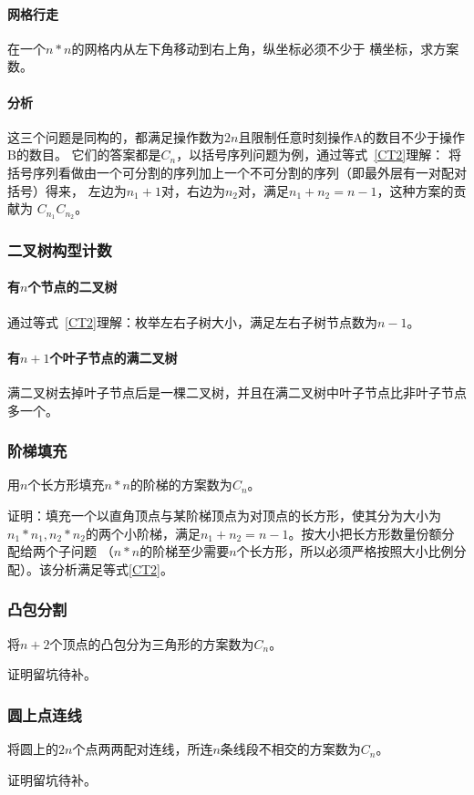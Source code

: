 \paragraph{网格行走} 在一个$n*n$的网格内从左下角移动到右上角，纵坐标必须不少于
横坐标，求方案数。
\paragraph{分析}
这三个问题是同构的，都满足操作数为$2n$且限制任意时刻操作A的数目不少于操作B的数目。
它们的答案都是$C_n$，以括号序列问题为例，通过等式~\ref{CT2}理解：
将括号序列看做由一个可分割的序列加上一个不可分割的序列（即最外层有一对配对括号）得来，
左边为$n_1+1$对，右边为$n_2$对，满足$n_1+n_2=n-1$，这种方案的贡献为
$C_{n_1}C_{n_2}$。
\subsubsection{二叉树构型计数}
\paragraph{有$n$个节点的二叉树}
通过等式~\ref{CT2}理解：枚举左右子树大小，满足左右子树节点数为$n-1$。
\paragraph{有$n+1$个叶子节点的满二叉树}
满二叉树去掉叶子节点后是一棵二叉树，并且在满二叉树中叶子节点比非叶子节点多一个。
\subsubsection{阶梯填充}
用$n$个长方形填充$n*n$的阶梯的方案数为$C_n$。

证明：填充一个以直角顶点与某阶梯顶点为对顶点的长方形，使其分为大小为
$n_1*n_1,n_2*n_2$的两个小阶梯，满足$n_1+n_2=n-1$。按大小把长方形数量份额分配给两个子问题
（$n*n$的阶梯至少需要$n$个长方形，所以必须严格按照大小比例分配）。该分析满足等式\ref{CT2}。
\subsubsection{凸包分割}
将$n+2$个顶点的凸包分为三角形的方案数为$C_n$。

证明留坑待补。
\subsubsection{圆上点连线}
将圆上的$2n$个点两两配对连线，所连$n$条线段不相交的方案数为$C_n$。

证明留坑待补。

